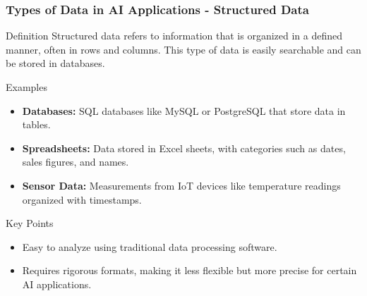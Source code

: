 \documentclass[aspectratio=169]{beamer}
\begin{document}
\begin{frame}[fragile]
    \frametitle{Types of Data in AI Applications - Structured Data}
    \begin{block}{Definition}
        Structured data refers to information that is organized in a defined manner, often in rows and columns. This type of data is easily searchable and can be stored in databases.
    \end{block}
    
    \begin{block}{Examples}
        \begin{itemize}
            \item \textbf{Databases:} SQL databases like MySQL or PostgreSQL that store data in tables.
            \item \textbf{Spreadsheets:} Data stored in Excel sheets, with categories such as dates, sales figures, and names.
            \item \textbf{Sensor Data:} Measurements from IoT devices like temperature readings organized with timestamps.
        \end{itemize}
    \end{block}
    
    \begin{block}{Key Points}
        \begin{itemize}
            \item Easy to analyze using traditional data processing software.
            \item Requires rigorous formats, making it less flexible but more precise for certain AI applications.
        \end{itemize}
    \end{block}
\end{frame}
\end{document}
